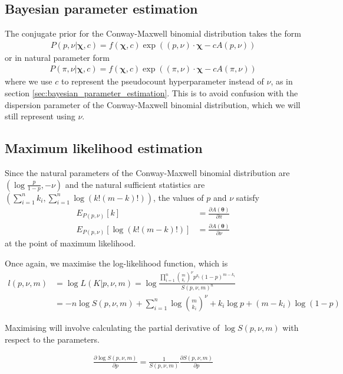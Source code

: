 \documentclass[a4paper,12pt]{article}
\theoremstyle{definition}
\newcommand{\pdiff}[2]{\frac{\partial #1}{\partial #2}} %
\begin{document}
\subsection{Bayesian parameter estimation}
The conjugate prior for the Conway-Maxwell binomial distribution takes the form
\begin{align}
  P(p, \nu | \boldsymbol{\chi}, c) = f(\boldsymbol{\chi}, c) \exp \left((p, \nu) \cdot \boldsymbol{\chi} - c A(p, \nu)\right)
\end{align}
or in natural parameter form 
\begin{align}
  P(\pi, \nu | \boldsymbol{\chi}, c) = f(\boldsymbol{\chi}, c) \exp \left((\pi, \nu) \cdot \boldsymbol{\chi} - c A(\pi, \nu)\right)
\end{align}
where we use $c$ to represent the pseudocount hyperparameter instead of $\nu$, as in section \ref{sec:bayesian_parameter_estimation}. This is to avoid confusion with the dispersion parameter of the Conway-Maxwell binomial distribution, which we will still represent using $\nu$.

\subsection{Maximum likelihood estimation}
Since the natural parameters of the Conway-Maxwell binomial distribution are $\left( \log \frac{p}{1-p}, -\nu \right)$ and the natural sufficient statistics are $\left( \sum_{i=1}^n k_i, \sum_{i=1}^n \log (k! (m-k)!) \right)$, the values of $p$ and $\nu$ satisfy 
\begin{align}
  E_{P(p,\nu)}[k] & = \pdiff{A(\boldsymbol{\theta})}{\pi} \\
  E_{P(p, \nu)}[\log (k!(m-k)!)] & = \pdiff{A(\boldsymbol{\theta})}{\nu}
\end{align}
at the point of maximum likelihood.

Once again, we maximise the log-likelihood function, which is
\begin{align}
  l(p, \nu, m) &= \log L(K | p, \nu, m) = \log \frac{\prod_{i=1}^{n} \binom{m}{k_i}^{\nu} p^{k_i} (1-p)^{m-k_i}}{S(p, \nu, m)^n} \\
  &= - n \log S(p, \nu, m) + \sum_{i=1}^{n} \log \binom{m}{k_i}^{\nu} + k_i \log p + (m - k_i) \log (1-p)
\end{align}

Maximising will involve calculating the partial derivative of $\log S(p, \nu, m)$ with respect to the parameters. 

\begin{align}
  \pdiff{\log S(p, \nu, m)}{p} = \frac{1}{S(p, \nu, m)} \pdiff{S(p, \nu, m)}{p}
\end{align}
\end{document}
